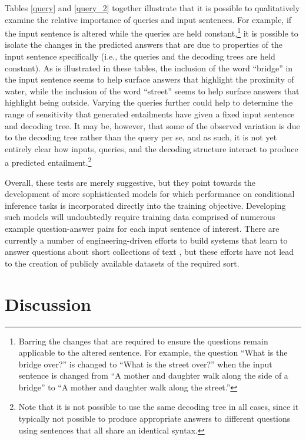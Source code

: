 \documentclass[utf8]{frontiersSCNS} %
\begin{document}
Tables \ref{query} and \ref{query_2} together illustrate that it is possible to qualitatively examine the relative importance of queries and input sentences. For example, if the input sentence is altered while the queries are held constant,\footnote{Barring the changes that are required to ensure the questions remain applicable to the altered sentence. For example, the question ``What is the bridge over?'' is changed to ``What is the street over?'' when the input sentence is changed from ``A mother and daughter walk along the side of a bridge'' to ``A mother and daughter walk along the street.''} it is possible to isolate the changes in the predicted answers that are due to properties of the input sentence specifically (i.e., the queries and the decoding trees are held constant). As is illustrated in these tables, the inclusion of the word ``bridge'' in the input sentence seems to help surface answers that highlight the proximity of water, while the inclusion of the word ``street'' seems to help surface answers that highlight being outside. Varying the queries further could help to determine the range of sensitivity that generated entailments have given a fixed input sentence and decoding tree. It may be, however, that some of the observed variation is due to the decoding tree rather than the query per se, and as such, it is not yet entirely clear how inputs, queries, and the decoding structure interact to produce a predicted entailment.\footnote{Note that it is not possible to use the same decoding tree in all cases, since it typically not possible to produce appropriate answers to different questions using sentences that all share an identical syntax.}

Overall, these tests are merely suggestive, but they point towards the development of more sophisticated models for which performance on conditional inference tasks is incorporated directly into the training objective. Developing such models will undoubtedly require training data comprised of numerous example question-answer pairs for each input sentence of interest. There are currently a number of engineering-driven efforts to build systems that learn to answer questions about short collections of text \citep[e.g.,][]{Weston:2015,Weston:2016,Sukhbataar:2015}, but these efforts have not lead to the creation of publicly available datasets of the required sort.

\section{Discussion}
\end{document}

